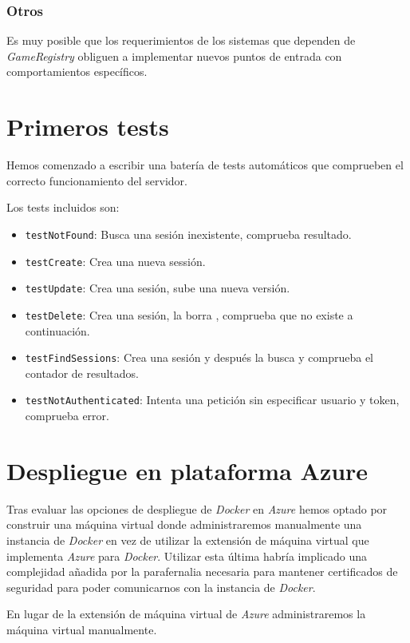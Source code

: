 \subsubsection{Otros}
Es muy posible que los requerimientos de los sistemas que dependen de \emph{GameRegistry}
obliguen a implementar nuevos puntos de entrada con comportamientos específicos.


\section{Primeros tests}
Hemos comenzado a escribir una batería de tests automáticos que comprueben el correcto
funcionamiento del servidor.

Los tests incluidos son:

\begin{itemize}
 \item \texttt{testNotFound}: Busca una sesión inexistente, comprueba resultado.
 \item \texttt{testCreate}: Crea una nueva sessión.
 \item \texttt{testUpdate}: Crea una sesión, sube una nueva versión.
 \item \texttt{testDelete}: Crea una sesión, la borra , comprueba que no existe a continuación.
 \item \texttt{testFindSessions}: Crea una sesión y después la busca y comprueba el contador de resultados.
 \item \texttt{testNotAuthenticated}: Intenta una petición sin especificar usuario y token, comprueba error.
\end{itemize}



\section{Despliegue en plataforma Azure}
Tras evaluar las opciones de despliegue de \emph{Docker} en \emph{Azure} hemos
optado por construir una máquina virtual donde administraremos manualmente una
instancia de \emph{Docker} en vez de utilizar la extensión de máquina virtual
que implementa \emph{Azure} para \emph{Docker}. Utilizar esta última habría implicado
una complejidad añadida por la parafernalia necesaria para mantener certificados de
seguridad para poder comunicarnos con la instancia de  \emph{Docker}.

En lugar de la extensión de máquina virtual de \emph{Azure} administraremos la 
máquina virtual manualmente.


